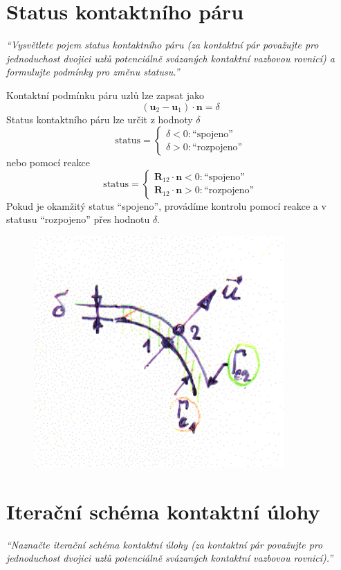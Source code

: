 \documentclass{article}
\begin{document}
	\section{Status kontaktního páru}
	\emph{``Vysvětlete pojem status kontaktního páru (za kontaktní pár považujte pro jednoduchost dvojici uzlů potenciálně svázaných kontaktní vazbovou rovnicí) a formulujte podmínky pro změnu statusu.''}

	Kontaktní podmínku páru uzlů lze zapsat jako
	\begin{equation}
		(\bm{u}_2 - \bm{u}_1 ) \cdot \bm{n} = \delta
	\end{equation}
	Status kontaktního páru lze určit z hodnoty $\delta$
	\begin{equation}
		\text{status} = \left\{
		    \begin{array}{ll}
		    	\delta < 0 : \text{``spojeno''} \\
		    	\delta > 0 : \text{``rozpojeno''}
		    \end{array}
		    \right.
	\end{equation}
	nebo pomocí reakce
	\begin{equation}
		\text{status} = \left\{
		    \begin{array}{ll}
		    	\bm{R}_{12} \cdot \bm{n} < 0 : \text{``spojeno''} \\
		    	\bm{R}_{12} \cdot \bm{n} > 0 : \text{``rozpojeno''}
		    \end{array}
		    \right.
	\end{equation}
	Pokud je okamžitý status ``spojeno'', provádíme kontrolu pomocí reakce a v statusu ``rozpojeno'' přes hodnotu $\delta$.
	\begin{figure}[h!]
		\centering
		\includegraphics[width=.5\linewidth]{figs/KontaktniPar.png}
	\end{figure}

	\section{Iterační schéma kontaktní úlohy}
	\emph{``Naznačte iterační schéma kontaktní úlohy (za kontaktní pár považujte pro jednoduchost dvojici uzlů potenciálně svázaných kontaktní vazbovou rovnicí).''}
\end{document}
